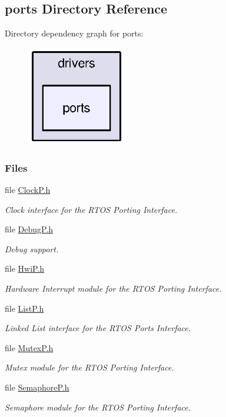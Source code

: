\subsection{ports Directory Reference}
\label{dir_48feca565b02475938ec5531d6e9635b}
Directory dependency graph for ports\+:
\nopagebreak
\begin{figure}[H]
\begin{center}
\leavevmode
\includegraphics[width=123pt]{dir_48feca565b02475938ec5531d6e9635b_dep}
\end{center}
\end{figure}
\subsubsection*{Files}
\begin{DoxyCompactItemize}
\item 
file \hyperlink{_clock_p_8h}{Clock\+P.\+h}
\begin{DoxyCompactList}\small\item\em Clock interface for the R\+T\+O\+S Porting Interface. \end{DoxyCompactList}\item 
file \hyperlink{_debug_p_8h}{Debug\+P.\+h}
\begin{DoxyCompactList}\small\item\em Debug support. \end{DoxyCompactList}\item 
file \hyperlink{_hwi_p_8h}{Hwi\+P.\+h}
\begin{DoxyCompactList}\small\item\em Hardware Interrupt module for the R\+T\+O\+S Porting Interface. \end{DoxyCompactList}\item 
file \hyperlink{_list_p_8h}{List\+P.\+h}
\begin{DoxyCompactList}\small\item\em Linked List interface for the R\+T\+O\+S Ports Interface. \end{DoxyCompactList}\item 
file \hyperlink{_mutex_p_8h}{Mutex\+P.\+h}
\begin{DoxyCompactList}\small\item\em Mutex module for the R\+T\+O\+S Porting Interface. \end{DoxyCompactList}\item 
file \hyperlink{_semaphore_p_8h}{Semaphore\+P.\+h}
\begin{DoxyCompactList}\small\item\em Semaphore module for the R\+T\+O\+S Porting Interface. \end{DoxyCompactList}\end{DoxyCompactItemize}
